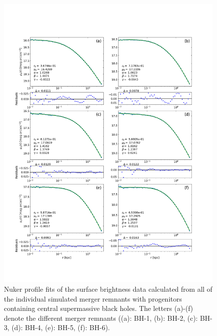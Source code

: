 \documentclass[english, oneside]{HYgradu}
\begin{document}
\begin{figure}[h]
	\centering
	\includegraphics[width=\textwidth]{all_nuker_profiles.png}
	\caption{Nuker profile fits of the surface brightness data calculated from all of the individual simulated merger remnants with progenitors containing central supermassive black holes. The letters (a)-(f) denote the different merger remnants ((a): BH-1, (b): BH-2, (c): BH-3, (d): BH-4, (e): BH-5, (f): BH-6).}
	\label{figure:all_nuker}
\end{figure}
\end{document}
